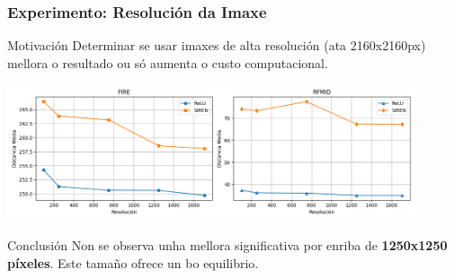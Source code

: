 \documentclass[xcolor=dvipsnames]{beamer}
\begin{document}
\begin{frame}
    \frametitle{Experimento: Resolución da Imaxe}

    \begin{block}{Motivación}
        Determinar se usar imaxes de alta resolución (ata 2160x2160px) mellora o resultado ou só aumenta o custo computacional.
    \end{block}

    \centering
    \includegraphics[width=0.9\textwidth]{../imaxes/resolutionchart.png}
    \begin{alertblock}{Conclusión}
        Non se observa unha mellora significativa por enriba de \textbf{1250x1250 píxeles}. Este tamaño ofrece un bo equilibrio.
    \end{alertblock}
\end{frame}






\end{document}
